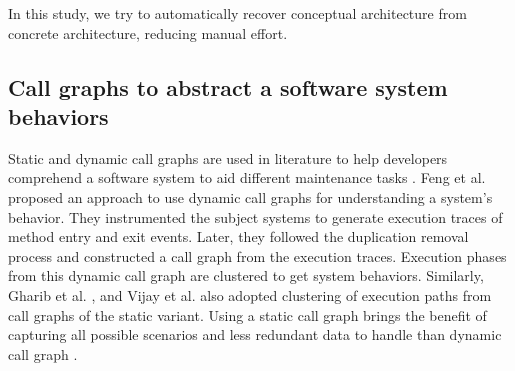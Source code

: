 In this study, we try to automatically recover conceptual architecture from concrete architecture, reducing manual effort.

\subsection{Call graphs to abstract a software system behaviors}

Static and dynamic call graphs are used in literature to help developers comprehend a software system to aid different maintenance tasks \cite{feng2018hierarchicalExecutionComprehension, gharibi2018automaticStaticCluster, xin2019identifyingFeaturesExecution}. Feng et al. \cite{feng2018hierarchicalExecutionComprehension} proposed an approach to use dynamic call graphs for understanding a system's behavior. They instrumented the subject systems to generate execution traces of method entry and exit events. Later, they followed the duplication removal process and constructed a call graph from the execution traces. Execution phases from this dynamic call graph are clustered to get system behaviors. Similarly, Gharib et al. \cite{gharibi2018automaticStaticCluster}, and Vijay et al. \cite{walunj2019graphevoEvolutionCall} also adopted clustering of execution paths from call graphs of the static variant. Using a static call graph brings the benefit of capturing all possible scenarios and less redundant data to handle than dynamic call graph \cite{gharibi2018automaticStaticCluster}. 

